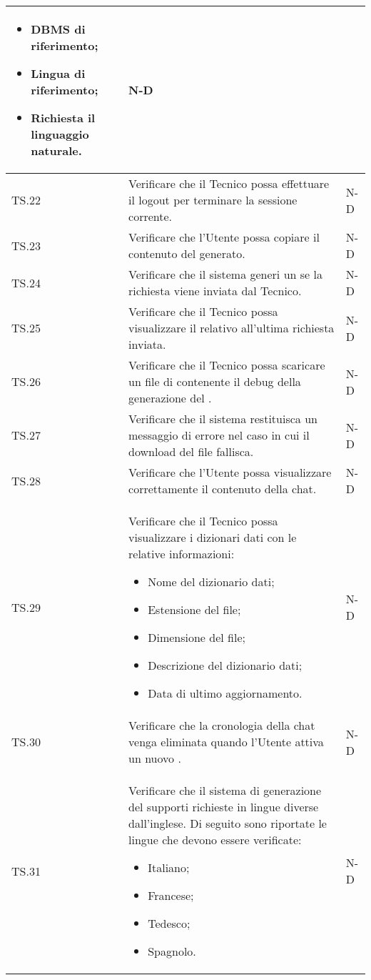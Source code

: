\begin{adjustwidth}{-0.5cm}{-0.5cm}
\begin{longtable}{|P{1.5cm}|>{\raggedright}P{9.5cm}|>{\arraybackslash}P{1.5cm}|}
\begin{itemize}
			\item DBMS di riferimento;
			\item Lingua di riferimento;
			\item Richiesta il linguaggio naturale.
		\end{itemize} & N-D \\
		\hline TS.22 & Verificare che il Tecnico possa effettuare il logout per terminare la sessione corrente. & N-D \\ 
		\hline TS.23 & Verificare che l'Utente possa copiare il contenuto del  generato. & N-D \\ 
		\hline TS.24 & Verificare che il sistema generi un  se la richiesta viene inviata dal Tecnico. & N-D \\ 
		\hline TS.25 & Verificare che il Tecnico possa visualizzare il  relativo all'ultima richiesta inviata. & N-D \\ 
		\hline TS.26 & Verificare che il Tecnico possa scaricare un file di  contenente il debug della generazione del . & N-D \\
		\hline TS.27 & Verificare che il sistema restituisca un messaggio di errore nel caso in cui il download del file fallisca. & N-D \\  
		\hline TS.28 & Verificare che l'Utente possa visualizzare correttamente il contenuto della chat. & N-D \\  
		\hline TS.29 & Verificare che il Tecnico possa visualizzare i dizionari dati con le relative informazioni:
		\begin{itemize}
			\item Nome del dizionario dati;
			\item Estensione del file;
			\item Dimensione del file;
			\item Descrizione del dizionario dati;
			\item Data di ultimo aggiornamento.
		\end{itemize} & N-D \\  
		\hline TS.30 & Verificare che la cronologia della chat venga eliminata quando l'Utente attiva un nuovo . & N-D \\  
		\hline TS.31 & Verificare che il sistema di generazione del  supporti richieste in lingue diverse dall'inglese. Di seguito sono riportate le lingue che devono essere verificate: 
		\begin{itemize}
			\item Italiano;
			\item Francese;
			\item Tedesco;
			\item Spagnolo. 
		\end{itemize}
		& N-D \\  
	\end{longtable}
\end{adjustwidth}
\egroup

